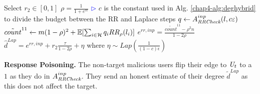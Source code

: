 %
%

\begin{algorithm}[bt]
	Select $r_2 \in [0,1]$\;
	$\rho = \frac{1}{1+e^{c\epsilon}}$\;
	\hfill\textcolor{blue}{$\rhd$} $c$ is the constant used in Alg. \ref{chap4-alg:deghybrid} to divide the budget between the RR and Laplace steps\;
	$q \gets A_{\textit{RRCheck}}^{inp}(l, c\varepsilon)$\;
	$\tilde{count}^{11} \gets m(1-\rho)^2 + \operatorname{\mathbb{E}}[\sum_{i \in \mathcal{H}} q_i RR_\rho(l_i)]$\;
	$ e^{rr,inp} = \frac{\tilde{count}^{11} - \rho^2 n}{1-2\rho}$\;
	$ \hat{d}^{Lap} = e^{rr,inp} + r_2 \frac{\tau}{1-2\rho} + \eta$ where $\eta \sim Lap(\frac{1}{(1-c)\epsilon})$\;
\caption{$A_{\DegHybrid}^{inp}: \{0,1\}^n\mapsto\{0,1\}^n$ }\label{chap4-alg:att-resp-inf2}
\end{algorithm}

\noindent\textbf{Response Poisoning.}
The non-target malicious users flip their edge to $\textit{U}_t$ to a $1$ as they do in $A_{\textit{RRCheck}{}}^{inp}$. They send an honest estimate of their degree $\tilde{d}^{Lap}$ as this does not affect the target.

